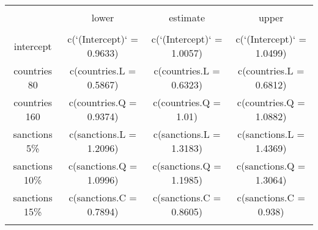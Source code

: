 
\begin{table}[!htbp] \centering 
  \caption{} 
  \label{tab:CIs} 
\begin{tabular}{@{\extracolsep{5pt}} cccc} 
\\[-1.8ex]\hline 
\hline \\[-1.8ex] 
 & lower & estimate & upper \\ 
\hline \\[-1.8ex] 
intercept & c(`(Intercept)` = 0.9633) & c(`(Intercept)` = 1.0057) & c(`(Intercept)` = 1.0499) \\ 
countries 80 & c(countries.L = 0.5867) & c(countries.L = 0.6323) & c(countries.L = 0.6812) \\ 
countries 160 & c(countries.Q = 0.9374) & c(countries.Q = 1.01) & c(countries.Q = 1.0882) \\ 
sanctions 5\% & c(sanctions.L = 1.2096) & c(sanctions.L = 1.3183) & c(sanctions.L = 1.4369) \\ 
sanctions 10\% & c(sanctions.Q = 1.0996) & c(sanctions.Q = 1.1985) & c(sanctions.Q = 1.3064) \\ 
sanctions 15\% & c(sanctions.C = 0.7894) & c(sanctions.C = 0.8605) & c(sanctions.C = 0.938) \\ 
\hline \\[-1.8ex] 
\end{tabular} 
\end{table}  
